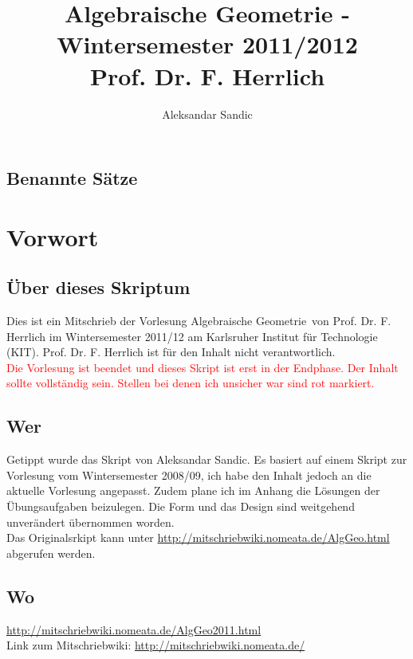 \documentclass[a4paper,12pt]{report}
\title{Algebraische Geometrie - Wintersemester 2011/2012\\ Prof. Dr. F. Herrlich}
\author{Aleksandar Sandic}
\theoremstyle{break}
\theoremstyle{nonumberbreak}
\theoremstyle{nonumberplain}
\begin{document}
\maketitle

\setlength\parskip{0.6pt}
\tableofcontents

\section*{Benannte S\"atze}


\setlength\parskip{\smallskipamount}



\chapter{Vorwort}
\setcounter{secnumdepth}{2}
\section*{\"Uber dieses Skriptum}
Dies ist ein Mitschrieb der Vorlesung \glqq Algebraische Geometrie\grqq\ von Prof. Dr. F. Herrlich im
Wintersemester 2011/12 am Karlsruher Institut f\"ur Technologie (KIT). Prof. Dr. F. Herrlich ist f\"ur  den Inhalt nicht verantwortlich.\\
\textcolor{red}{Die Vorlesung ist beendet und dieses Skript ist erst in der Endphase. Der Inhalt sollte vollst\"andig sein. Stellen bei denen ich unsicher war sind rot markiert.}
\section*{Wer}
Getippt wurde das Skript von Aleksandar Sandic. Es basiert auf einem Skript zur Vorlesung vom Wintersemester 2008/09, ich habe den Inhalt jedoch an die aktuelle Vorlesung angepasst. Zudem plane ich im Anhang die L\"osungen der \"Ubungsaufgaben beizulegen. Die Form und das Design sind weitgehend unver\"andert \"ubernommen worden.\\
Das Originalsrkipt kann unter \url{http://mitschriebwiki.nomeata.de/AlgGeo.html} abgerufen werden.

\section*{Wo}
\url{http://mitschriebwiki.nomeata.de/AlgGeo2011.html}\\
Link zum Mitschriebwiki: \url{http://mitschriebwiki.nomeata.de/}
\end{document}
